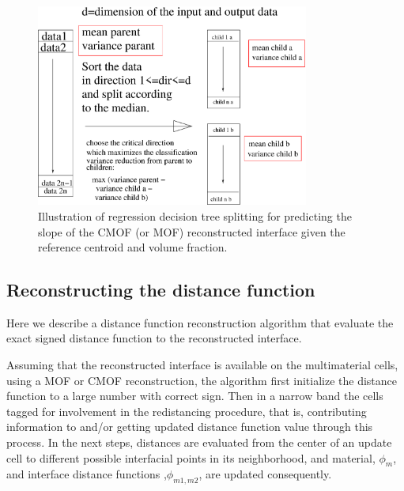 \documentclass[]{article}
\begin{document}
\begin{figure}[htbp]
\centering
\includegraphics[width=0.8\textwidth]{DT_figure.eps}
\caption{Illustration of regression decision tree 
 splitting\cite{breiman1984classification}\label{DT_figure} for 
 predicting the slope of the CMOF (or MOF) reconstructed interface
 given the reference centroid and volume fraction.}
\end{figure}


\subsection{Reconstructing the distance function \label{MMRECON}}
Here we describe a distance function reconstruction algorithm that evaluate the exact signed distance function to the reconstructed interface.

Assuming that the reconstructed interface is available on the multimaterial cells, using a MOF or CMOF reconstruction, the algorithm first initialize the distance function to a large number with correct sign. Then in a narrow band the cells tagged for involvement in the redistancing procedure, that is, contributing information to and/or getting updated distance function value through this process. In the next steps, distances are evaluated from the center of an update cell to different possible interfacial points in its neighborhood, and material, $\phi_m$, and interface distance functions ,$\phi_{m1,m2}$, are updated consequently.
\end{document}
